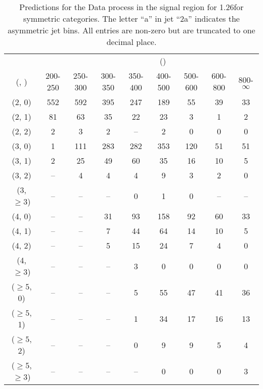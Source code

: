 \begin{table}[h!]
\tiny
\centering
\caption{Predictions for the Data process in the signal region for 1.26\ifb for symmetric categories. The letter ``a'' in jet \eg ``2a''  indicates the asymmetric jet bins. All entries are non-zero but are truncated to one decimal place.\label{tab:predsep_data_sig_sym}}
\begin{tabular}
{ccccccccc}
	\hline\hline
&	& \multicolumn{8}{c}{\scalht (\gev)} \\ 
	 (\njet,  \nb) & 200-250 & 250-300 & 300-350 & 350-400 & 400-500 & 500-600 & 600-800 & 800-$\infty$ \\ [0.8ex] 
\hline
	(2, 0) & 552 & 592 & 395 & 247 & 189 & 55 & 39 & 33 \\[0.5ex] 
	(2, 1) & 81 & 63 & 35 & 22 & 23 & 3 & 1 & 2 \\[0.5ex] 
	(2, 2) & 2 & 3 & 2 & -- & 2 & 0 & 0 & 0 \\[0.5ex] 
	(3, 0) & 1 & 111 & 283 & 282 & 353 & 120 & 51 & 51 \\[0.5ex] 
	(3, 1) & 2 & 25 & 49 & 60 & 35 & 16 & 10 & 5 \\[0.5ex] 
	(3, 2) & -- & 4 & 4 & 4 & 9 & 3 & 2 & 0 \\[0.5ex] 
	(3, $\ge3$) & -- & -- & -- & 0 & 1 & 0 & -- & -- \\[0.5ex] 
	(4, 0) & -- & -- & 31 & 93 & 158 & 92 & 60 & 33 \\[0.5ex] 
	(4, 1) & -- & -- & 7 & 44 & 64 & 14 & 10 & 5 \\[0.5ex] 
	(4, 2) & -- & -- & 5 & 15 & 24 & 7 & 4 & 0 \\[0.5ex] 
	(4, $\ge3$) & -- & -- & -- & 3 & 0 & 0 & 0 & 0 \\[0.5ex] 
	($\ge5$, 0) & -- & -- & -- & 5 & 55 & 47 & 41 & 36 \\[0.5ex] 
	($\ge5$, 1) & -- & -- & -- & 1 & 34 & 17 & 16 & 13 \\[0.5ex] 
	($\ge5$, 2) & -- & -- & -- & 0 & 9 & 9 & 5 & 4 \\[0.5ex] 
	($\ge5$, $\ge3$) & -- & -- & -- & -- & 0 & 0 & 0 & 3 \\[0.5ex] 
	\hline
	\hline
\end{tabular}
\end{table}
